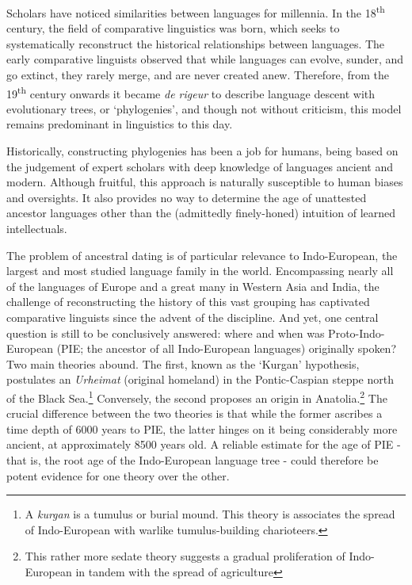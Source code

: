 \documentclass[10pt,journal,compsoc]{IEEEtran}
\newcommand{\ts}{\textsuperscript}
\begin{document}
Scholars have noticed similarities between languages for millennia. In the 18\ts{th} century, the field of comparative linguistics was born, which seeks to systematically reconstruct the historical relationships between languages. The early comparative linguists observed that while languages can evolve, sunder, and go extinct, they rarely merge, and are never created anew. Therefore, from the 19\ts{th} century onwards it became \textit{de rigeur} to describe language descent with evolutionary trees, or `phylogenies', and though not without criticism, this model remains predominant in linguistics to this day.

Historically, constructing phylogenies has been a job for humans, being based on the judgement of expert scholars with deep knowledge of languages ancient and modern. Although fruitful, this approach is naturally susceptible to human biases and oversights. It also provides no way to determine the age of unattested ancestor languages other than the (admittedly finely-honed) intuition of learned intellectuals\cite{atkinson2005curious}.

The problem of ancestral dating is of particular relevance to Indo-European, the largest and most studied language family in the world. Encompassing nearly all of the languages of Europe and a great many in Western Asia and India, the challenge of reconstructing the history of this vast grouping has captivated comparative linguists since the advent of the discipline. And yet, one central question is still to be conclusively answered: where and when was Proto-Indo-European (PIE; the ancestor of all Indo-European languages) originally spoken? Two main theories abound. The first, known as the `Kurgan' hypothesis, postulates an \textit{Urheimat} (original homeland) in the Pontic-Caspian steppe north of the Black Sea\cite{gimbutas1974gods}.\footnote{A \textit{kurgan} is a tumulus or burial mound. This theory is associates the spread of Indo-European with warlike tumulus-building charioteers.} Conversely, the second proposes an origin in Anatolia\cite{renfrew2001anatolian}.\footnote{This rather more sedate theory suggests a gradual proliferation of Indo-European in tandem with the spread of agriculture} The crucial difference between the two theories is that while the former ascribes a time depth of 6000 years to PIE, the latter hinges on it being considerably more ancient, at approximately 8500 years old. A reliable estimate for the age of PIE - that is, the root age of the Indo-European language tree - could therefore be potent evidence for one theory over the other.
\end{document}

